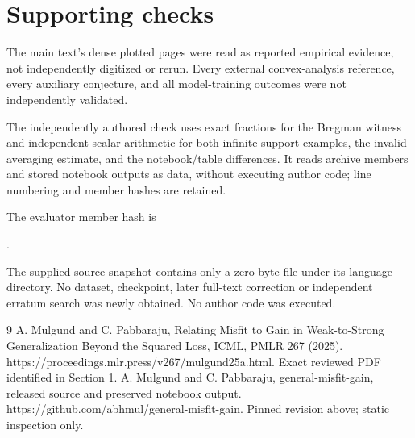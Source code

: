 \documentclass[10pt]{article}
\begin{document}
\section*{Supporting checks}
The main text’s dense plotted pages were read as reported empirical evidence, not independently digitized or rerun. Every external convex-analysis reference, every auxiliary conjecture, and all model-training outcomes were not independently validated.\par
The independently authored check uses exact fractions for the Bregman witness and independent scalar arithmetic for both infinite-support examples, the invalid averaging estimate, and the notebook/table differences. It reads archive members and stored notebook outputs as data, without executing author code; line numbering and member hashes are retained.\par
The evaluator member hash is\par
.\par
The supplied source snapshot contains only a zero-byte file under its language directory. No dataset, checkpoint, later full-text correction or independent erratum search was newly obtained. No author code was executed.\par
9 A. Mulgund and C. Pabbaraju, Relating Misfit to Gain in Weak-to-Strong Generalization Beyond the Squared Loss, ICML, PMLR 267 (2025). https://proceedings.mlr.press/v267/mulgund25a.html. Exact reviewed PDF identified in Section 1. A. Mulgund and C. Pabbaraju, general-misfit-gain, released source and preserved notebook output. https://github.com/abhmul/general-misfit-gain. Pinned revision above; static inspection only.\par
\end{document}
